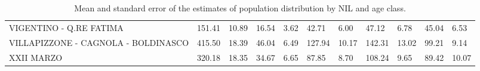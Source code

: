 \begin{table}[H]
{{\begin{tabular}{lp{1.3cm}p{1.3cm}p{1.3cm}p{1.3cm}p{1.3cm}p{1.3cm}p{1.3cm}p{1.3cm}p{1.3cm}p{1.3cm}}
VIGENTINO - Q.RE FATIMA                            &                    151.41 &                 10.89 &                       16.54 &                    3.62 &                       42.71 &                    6.00 &                       47.12 &                    6.78 &                     45.04 &                  6.53 \\
VILLAPIZZONE - CAGNOLA - BOLDINASCO                &                    415.50 &                 18.39 &                       46.04 &                    6.49 &                      127.94 &                   10.17 &                      142.31 &                   13.02 &                     99.21 &                  9.14 \\
XXII MARZO                                         &                    320.18 &                 18.35 &                       34.67 &                    6.65 &                       87.85 &                    8.70 &                      108.24 &                    9.65 &                     89.42 &                 10.07 \\
\bottomrule
\end{tabular}
}}
    \caption{Mean and standard error of the estimates of population distribution by NIL and age class.}
    \label{tab:pop_nil_msd}
\end{table}


